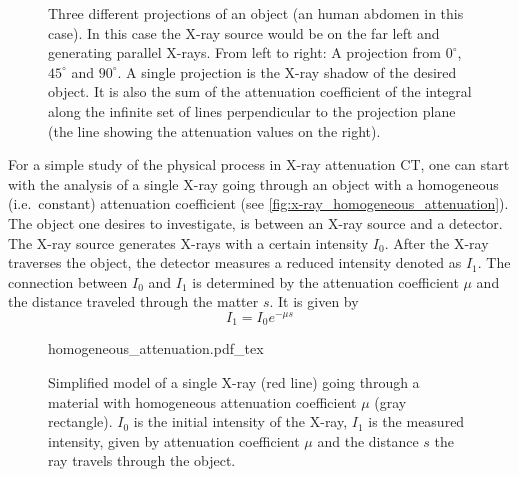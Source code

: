 \begin{figure}
	\centering
	\caption{Three different projections of an object (an human abdomen in this case). In this
                case the X-ray source would be on the far left and generating parallel X-rays. From
                left to right: A projection from \(0^\circ\), \(45^\circ\) and \(90^\circ\). A
                single projection is the X-ray shadow of the desired object. It is also the sum of
                the attenuation coefficient of the integral along the infinite set of lines
                perpendicular to the projection plane (the line showing the attenuation values on
                the right).
	}\label{fig:sinogram_example_abdomen}
\end{figure}

For a simple study of the physical process in X-ray attenuation CT, one can start with the analysis
of a single X-ray going through an object with a homogeneous (i.e.\ constant) attenuation
coefficient (see \autoref{fig:x-ray_homogeneous_attenuation}). The object one desires to
investigate, is between an X-ray source and a detector. The X-ray source generates X-rays with a
certain intensity \(I_0\). After the X-ray traverses the object, the detector measures a reduced
intensity denoted as \(I_1\). The connection between \(I_0\) and \(I_1\) is determined by the
attenuation coefficient \(\mu\) and the distance traveled through the matter \(s\). It is given by
\[ I_1 = I_0 e^{-\mu s} \]

\begin{figure}
	\centering
	\def\svgwidth{0.75\textwidth}
	{homogeneous_attenuation.pdf_tex}
	\caption{Simplified model of a single X-ray (red line) going through a material with
		homogeneous attenuation coefficient \(\mu\) (gray rectangle). \(I_0\) is the initial
		intensity of the X-ray, \(I_1\) is the measured intensity, given by attenuation
		coefficient \(\mu\) and the distance \(s\) the ray travels through the
		object.}\label{fig:x-ray_homogeneous_attenuation}
\end{figure}

